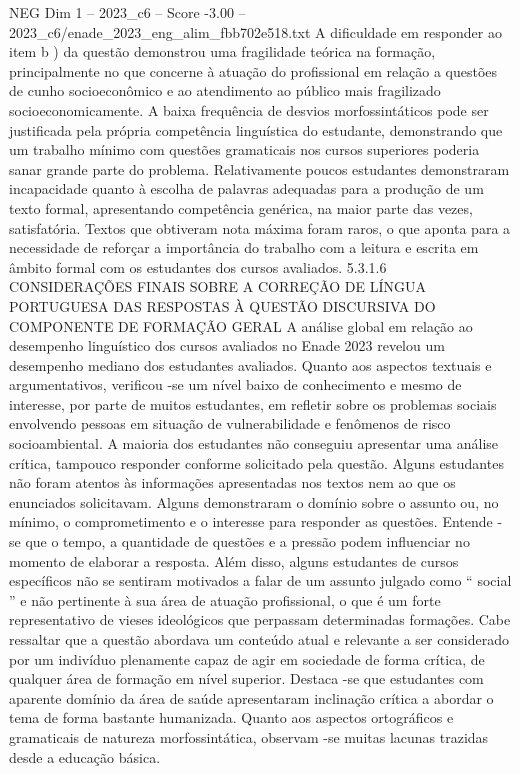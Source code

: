\begin{textsample}{NEG Dim 1 – 2023\_c6 – Score -3.00 – 2023\_c6/enade\_2023\_eng\_alim\_fbb702e518.txt}
A dificuldade em responder ao item b ) da questão demonstrou uma fragilidade teórica na formação, principalmente no que concerne à atuação do profissional em relação a questões de cunho socioeconômico e ao atendimento ao público mais fragilizado socioeconomicamente.
A baixa frequência de desvios morfossintáticos pode ser justificada pela própria competência linguística do estudante, demonstrando que um trabalho mínimo com questões gramaticais nos cursos superiores poderia sanar grande parte do problema.
Relativamente poucos estudantes demonstraram incapacidade quanto à escolha de palavras adequadas para a produção de um texto formal, apresentando competência genérica, na maior parte das vezes, satisfatória.
Textos que obtiveram nota máxima foram raros, o que aponta para a necessidade de reforçar a importância do trabalho com a leitura e escrita em âmbito formal com os estudantes dos cursos avaliados. 5.3.1.6 CONSIDERAÇÕES FINAIS SOBRE A CORREÇÃO DE LÍNGUA PORTUGUESA DAS RESPOSTAS À QUESTÃO DISCURSIVA DO COMPONENTE DE FORMAÇÃO GERAL A análise global em relação ao desempenho linguístico dos cursos avaliados no Enade 2023 revelou um desempenho mediano dos estudantes avaliados.
Quanto aos aspectos textuais e argumentativos, verificou -se um nível baixo de conhecimento e mesmo de interesse, por parte de muitos estudantes, em refletir sobre os problemas sociais envolvendo pessoas em situação de vulnerabilidade e fenômenos de risco socioambiental.
A maioria dos estudantes não conseguiu apresentar uma análise crítica, tampouco responder conforme solicitado pela questão.
Alguns estudantes não foram atentos às informações apresentadas nos textos nem ao que os enunciados solicitavam.
Alguns demonstraram o domínio sobre o assunto ou, no mínimo, o comprometimento e o interesse para responder as questões.
Entende -se que o tempo, a quantidade de questões e a pressão podem influenciar no momento de elaborar a resposta.
Além disso, alguns estudantes de cursos específicos não se sentiram motivados a falar de um assunto julgado como “ social ” e não pertinente à sua área de atuação profissional, o que é um forte representativo de vieses ideológicos que perpassam determinadas formações.
Cabe ressaltar que a questão abordava um conteúdo atual e relevante a ser considerado por um indivíduo plenamente capaz de agir em sociedade de forma crítica, de qualquer área de formação em nível superior.
Destaca -se que estudantes com aparente domínio da área de saúde apresentaram inclinação crítica a abordar o tema de forma bastante humanizada.
Quanto aos aspectos ortográficos e gramaticais de natureza morfossintática, observam -se muitas lacunas trazidas desde a educação básica.

\end{textsample}
